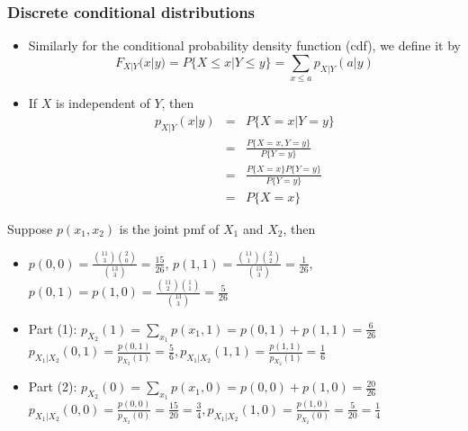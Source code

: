 \documentclass[slidestop,compress,mathserif]{beamer}
\begin{document}
\begin{frame}\frametitle{Discrete conditional distributions}
\begin{itemize}
\item Similarly for the conditional probability density function (cdf), we define it by
$$F_{X|Y}(x|y) = P\{X \leq x|Y \leq y\} = \sum_{x \leq a}p_{X|Y}(a|y)$$
\vspace{4mm}
\pause
\item If $X$ is independent of $Y$, then
\begin{eqnarray*}
p_{X|Y}(x|y) &=& P\{X = x|Y = y\}\\
&=&\frac{P\{X = x, Y = y\}}{P\{Y = y\}} \\
&=&\frac{P\{X = x\}P\{Y = y\}}{P\{Y = y\}}\\
&=&P\{X = x\}
\end{eqnarray*}
\end{itemize}
\end{frame}


\begin{frame}%
\pause
{\small{
Suppose $p(x_1, x_2)$ is the joint pmf of $X_1$ and $X_2$, then
\begin{itemize}
\item $p(0, 0) = \frac{{11 \choose 3} {2 \choose 0}}{{13 \choose 3}} = \frac{15}{26}$, $p(1, 1) = \frac{{11 \choose 1}{2 \choose 2}}{{13 \choose 3}} = \frac{1}{26}$, $p(0, 1) = p(1, 0) = \frac{{11 \choose 2}{1 \choose 1}}{{13 \choose 3}} = \frac{5}{26}$
\vspace{2mm}
\pause
\item Part (1): $p_{X_2}(1) = \sum_{x_1}p(x_1, 1) = p(0, 1) + p(1, 1) = \frac{6}{26}$ $p_{X_1|X_2}(0, 1) = \frac{p(0, 1)}{p_{X_2}(1)} = \frac{5}{6}, p_{X_1|X_2}(1, 1) = \frac{p(1, 1)}{p_{X_2}(1)} = \frac{1}{6}$
\vspace{2mm}
\pause
\item Part (2): $p_{X_2}(0) = \sum_{x_1}p(x_1, 0) = p(0, 0) + p(1, 0) = \frac{20}{26}$ $p_{X_1|X_2}(0, 0) = \frac{p(0, 0)}{p_{X_2}(0)} = \frac{15}{20} = \frac{3}{4}, p_{X_1|X_2}(1, 0) = \frac{p(1, 0)}{p_{X_2}(0)} = \frac{5}{20} = \frac{1}{4}$
\end{itemize}
}}
\end{frame}
\end{document}
